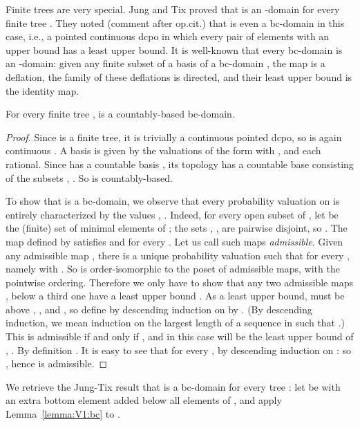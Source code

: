 \documentclass{LMCS}
\begin{document}
Finite trees are very special.  Jung and Tix proved that  is an -domain \cite[Theorem~13]{JT:troublesome} for
every finite tree .  They noted (comment after op.cit.) that
 is even a bc-domain in this case, i.e., a pointed
continuous dcpo in which every pair of elements with an upper bound
has a least upper bound.  It is well-known that every bc-domain is an
-domain: given any finite subset  of a basis  of a
bc-domain , the map  is a
deflation, the family of these deflations is directed, and their least
upper bound is the identity map.
\begin{lem}
  \label{lemma:V1:bc}
  For every finite tree ,  is a countably-based
  bc-domain.
\end{lem}
\begin{proof}
  Since  is a finite tree, it is trivially a continuous pointed
  dcpo, so  is again continuous
  \cite[Section~3]{Edalat:int}.  A basis is given by the valuations of
  the form  with ,
   and each  rational.  Since 
  has a countable basis , its topology has a countable base
  consisting of the subsets , .  So 
  is countably-based.

  To show that  is a bc-domain, we observe that every
  probability valuation  on  is entirely characterized by the
  values , .  Indeed, for every open subset 
  of , let  be the (finite) set of minimal elements of ;
  the sets , , are pairwise disjoint, so .  The map 
  defined by  satisfies  and  for every .  Let us
  call such maps {\em admissible\/}.  Given any admissible map ,
  there is a unique probability valuation  such that  for every , namely 
  with .  So  is order-isomorphic to the poset of admissible maps, with the
  pointwise ordering.  Therefore we only have to show that any two
  admissible maps ,  below a third one  have a least
  upper bound .  As a least upper bound,  must be above , , and , so define
   by descending induction on  by .  (By descending
  induction, we mean induction on the largest length  of a sequence
   in  such that .)  This is
  admissible if and only if , and in this case will be the
  least upper bound of , .  By definition .
  It is easy to see that  for every , by
  descending induction on : so , hence
   is admissible.
\end{proof}
We retrieve the Jung-Tix result that  is a
bc-domain for every tree : let  be  with an extra bottom
element added below all elements of , and apply
Lemma~\ref{lemma:V1:bc} to .
\end{document}
